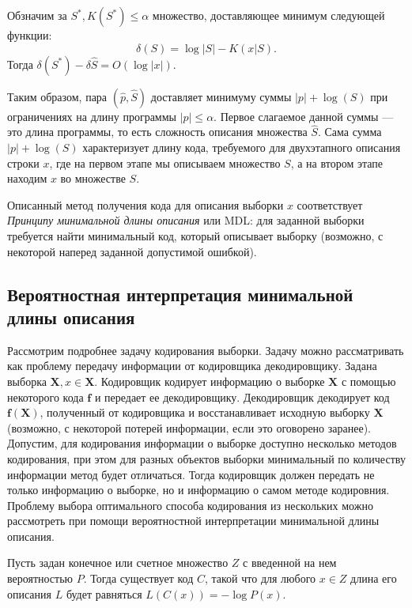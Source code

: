 \documentclass[../main.tex]{subfiles}
\begin{document}
\begin{theorembd}
Обзначим за $S^{*}, K(S^{*}) \leq \alpha$  множество, доставляющее минимум следующей функции:
\[
    \delta(S) = \log{|S|} - K(x|S).
\]
Тогда  $\delta(S^{*}) - \delta{\hat{S}} = O(\log |x|).$
\end{theorembd}

Таким образом, пара $(\hat{p}, \hat{S})$ доставляет минимуму суммы $|p| + \log(S)$ при ограничениях на длину программы $|p| \leq \alpha$. Первое слагаемое данной суммы --- это длина  программы, то есть сложность описания множества $\hat{S}$. Сама сумма $|p| + \log(S)$ характеризует длину кода, требуемого для двухэтапного описания строки $x$, где на первом этапе мы описываем множество $S$, а на втором этапе находим $x$ во множестве $S$.

Описанный метод получения кода для описания выборки $x$ соответствует \textit{Принципу минимальной длины описания} или MDL: для заданной выборки требуется найти минимальный код, который описывает выборку (возможно, с некоторой наперед заданной допустимой ошибкой).

\subsection{Вероятностная интерпретация минимальной длины описания}
Рассмотрим подробнее задачу кодирования выборки. Задачу можно рассматривать как проблему передачу информации от кодировщика декодировщику. Задана выборка $\mathbf{X}, x \in \mathbf{X}$. Кодировщик кодирует информацию о выборке $\mathbf{X}$ с помощью некоторого кода $\mathbf{f}$ и передает ее декодировщику. Декодировщик декодирует код $\mathbf{f}(\mathbf{X})$, полученный от кодировщика и восстанавливает исходную выборку $\mathbf{X}$ (возможно, с некоторой потерей информации, если это оговорено заранее).
Допустим, для кодирования информации о выборке доступно несколько методов кодирования, при этом для разных объектов выборки минимальный по количеству информации метод будет отличаться. Тогда кодировщик должен передать не только информацию о выборке, но и информацию о самом методе кодировния. Проблему выбора оптимального способа кодирования из нескольких можно рассмотреть при помощи вероятностной интерпретации минимальной длины описания.
\begin{theorembd}
Пусть задан конечное или счетное множество $Z$ с введенной на нем вероятностью $P$. Тогда существует код $C$, такой что для любого $x \in Z$ длина его описания $L$ будет равняться  $L(C(x)) = -\log P(x)$.
\end{theorembd}
\end{document}
